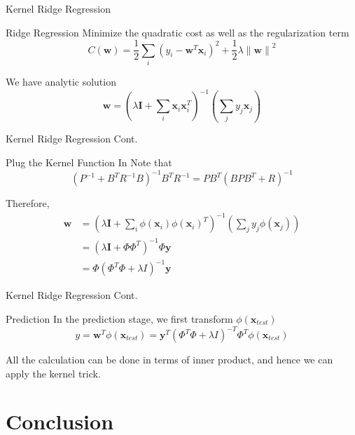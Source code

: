\documentclass[10pt, compress]{beamer}
\begin{document}
\begin{frame}[fragile]{Kernel Ridge Regression}
  \begin{block}{Ridge Regression}
    Minimize the quadratic cost as well as the regularization term
    \[
      C(\mathbf{w}) = \frac{1}{2} \sum_{i} {(y_i - \mathbf{w}^T\mathbf{x}_i)}^2 + \frac{1}{2} \lambda {\| \mathbf{w} \|}^2
    \]

    We have analytic solution
    \[
      \mathbf{w} = {(\lambda \mathbf{I} + \sum_{i} \mathbf{x}_i \mathbf{x}_i^T )}^{-1} (\sum_{j} y_j \mathbf{x}_j)
    \]
  \end{block}
\end{frame}

\begin{frame}[fragile]{Kernel Ridge Regression Cont.}
  \begin{block}{Plug the Kernel Function In}
    Note that
    \[
      {(P^{-1} + B^T R^{-1} B)}^{-1} B^T R^{-1} = PB^T {(BPB^T + R)}^{-1}
    \]

    Therefore,
    \begin{align*}
      \mathbf{w} &= {(\lambda \mathbf{I} + \sum_{i} \phi(\mathbf{x}_i) {\phi(\mathbf{x}_i)}^T )}^{-1} (\sum_{j} y_j \phi(\mathbf{x}_j)) \\
                &= {(\lambda \mathbf{I} + \Phi \Phi^T) }^{-1} \Phi \mathbf{y} \\
                &= \Phi {(\Phi^T \Phi + \lambda I)}^{-1} \mathbf{y}
    \end{align*}
  \end{block}
\end{frame}

\begin{frame}[fragile]{Kernel Ridge Regression Cont.}
  \begin{block}{Prediction}
    In the prediction stage, we first transform \( \phi(\mathbf{x}_{test}) \)
    \[
      y = \mathbf{w}^T \phi(\mathbf{x}_{test}) = \mathbf{y}^T {(\Phi^T \Phi + \lambda I)}^{-T} {\Phi}^T \phi(\mathbf{x}_{test})
    \]

    All the calculation can be done in terms of inner product, and hence we can apply the kernel trick.
  \end{block}
\end{frame}

\section{Conclusion}
\end{document}
